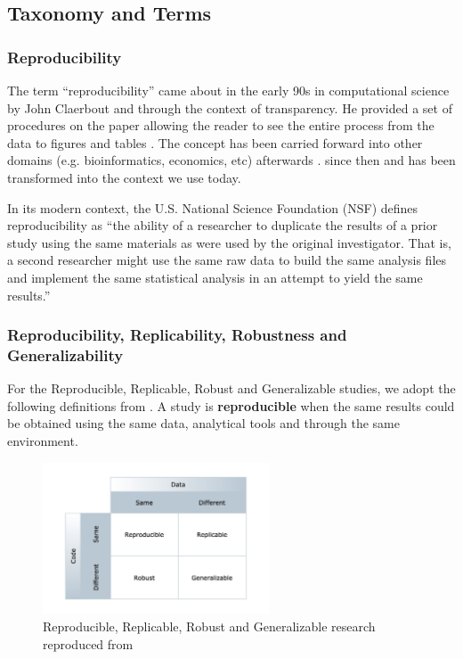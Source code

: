 \subsection{Taxonomy and Terms}

\subsubsection{Reproducibility}
The term “reproducibility” came about in the early 90s in computational science by John Claerbout and through the 
context of transparency. He provided a set of procedures on the paper allowing the reader to see the entire process 
from the data to figures and tables \cite{claerbout_electronic_1992}. The concept has been carried forward into 
other domains (e.g. bioinformatics, economics, etc) afterwards 
\cite{king_replication_1995,peng_reproducible_2006,schwab_making_2000}. since then and has been transformed into 
the context we use today.

In its modern context, the U.S. National Science Foundation (NSF) \cite{cacioppo_social_2015} defines reproducibility 
as “the ability of a researcher to duplicate the results of a prior study using the same materials as were used by 
the original investigator. That is, a second researcher might use the same raw data to build the same analysis files 
and implement the same statistical analysis in an attempt to yield the same results.” 

\subsubsection{Reproducibility, Replicability, Robustness and Generalizability}
For the Reproducible, Replicable, Robust and Generalizable studies, we adopt the following definitions 
from \cite{pineau_improving_2020}. A study is \textbf{reproducible} when the same results could be obtained using the same data, 
analytical tools and through the same environment.

\begin{figure}[ht]
    \centering
    \includegraphics[width=0.60\textwidth]{figures/01ReproducibleReplicable.jpg}
    \caption{Reproducible, Replicable, Robust and Generalizable research reproduced from~\cite{whitaker_showing_2017}}
    \label{fig:ReproducibleReplicable}
\end{figure}

